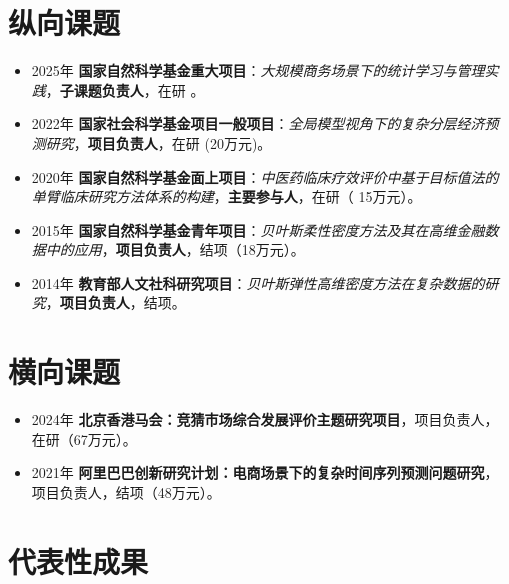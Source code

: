 \documentclass[twoside,a4paper,11pt]{article}
\begin{document}
\section{纵向课题}

\begin{itemize}

\item 2025年 \textbf{国家自然科学基金重大项目}：\emph{大规模商务场景下的统计学习与管理实践}，\textbf{子课题负责人}，在研 。

\item 2022年 \textbf{国家社会科学基金项目一般项目}：\emph{全局模型视角下的复杂分层经济预测研究}，\textbf{项目负责人}，在研 (20万元)。

\item 2020年 \textbf{国家自然科学基金面上项目}：\emph{中医药临床疗效评价中基于目标值法的单臂临床研究方法体系的构建}，\textbf{主要参与人}，在研（ 15万元）。

\item 2015年 \textbf{国家自然科学基金青年项目}：\emph{贝叶斯柔性密度方法及其在高维金融数据中的应用}，\textbf{项目负责人}，结项（18万元）。

\item 2014年 \textbf{教育部人文社科研究项目}：\emph{贝叶斯弹性高维密度方法在复杂数据的研究}，\textbf{项目负责人}，结项。

\end{itemize}

\section{横向课题}
\begin{itemize}

\item 2024年 \textbf{北京香港马会：竞猜市场综合发展评价主题研究项目}，项目负责人，在研（67万元）。

\item 2021年 \textbf{阿里巴巴创新研究计划：电商场景下的复杂时间序列预测问题研究}，项目负责人，结项（48万元）。

\end{itemize}

\section{代表性成果}
\begin{refsection}
\nocite{HuangY2024LocalInformation}
\nocite{ZhangB2023OptimalReconciliation}
\nocite{KangY2022ForecastForecasts}
\nocite{ZhuX2021LeastSquareApproximation}
\nocite{LiF2018ImprovingForecasting}
\printbibliography[heading=none]
\end{refsection}
\end{document}
